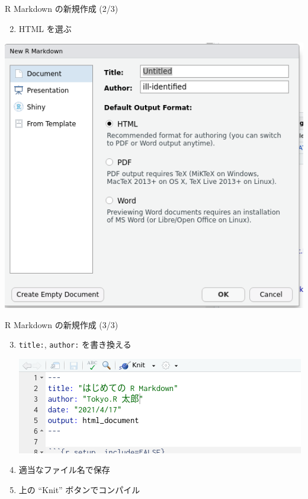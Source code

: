 \documentclass[
  ignorenonframetext,
]{beamer}
\providecommand{\tightlist}{%
  \setlength{\itemsep}{0pt}\setlength{\parskip}{0pt}}
\begin{document}
\begin{frame}{R Markdown の新規作成 (2/3)}
\protect\hypertarget{r-markdown-ux306eux65b0ux898fux4f5cux6210-23}{}
\begin{enumerate}
\setcounter{enumi}{1}
\tightlist
\item
  HTML を選ぶ
\end{enumerate}

\begin{center}\includegraphics[width=1\linewidth,height=1\textheight,keepaspectratio]{img/select-html} \end{center}
\end{frame}

\begin{frame}[fragile]{R Markdown の新規作成 (3/3)}
\protect\hypertarget{r-markdown-ux306eux65b0ux898fux4f5cux6210-33}{}
\begin{enumerate}
\setcounter{enumi}{2}
\item
  \texttt{title:}, \texttt{author:} を書き換える

  \begin{center}\includegraphics[width=1\linewidth,height=1\textheight,keepaspectratio]{img/newbie} \end{center}
\item
  適当なファイル名で保存
\item
  上の ``Knit'' ボタンでコンパイル
\end{enumerate}
\end{frame}
\end{document}
